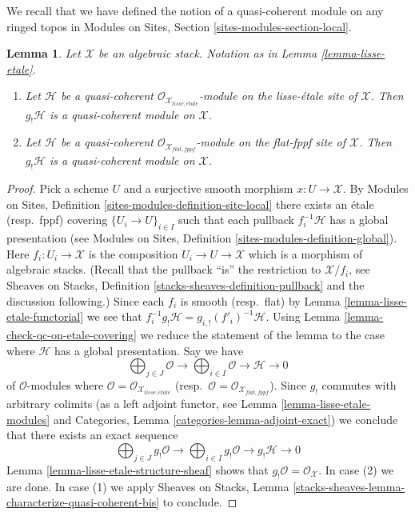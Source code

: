 \documentclass{stacks-project}
\theoremstyle{plain}
\newtheorem{lemma}[subsection]{Lemma}
\theoremstyle{definition}
\theoremstyle{remark}
\numberwithin{equation}{subsection}
\def\etale{{\acute{e}tale}}
\begin{document}
\noindent
We recall that we have defined the notion of a quasi-coherent module on
any ringed topos in
Modules on Sites, Section \ref{sites-modules-section-local}.

\begin{lemma}
\label{lemma-shriek-quasi-coherent}
Let $\mathcal{X}$ be an algebraic stack. Notation as in
Lemma \ref{lemma-lisse-etale}.
\begin{enumerate}
\item Let $\mathcal{H}$ be a quasi-coherent
$\mathcal{O}_{\mathcal{X}_{lisse,\etale}}$-module 
on the lisse-\'etale site of $\mathcal{X}$. Then $g_!\mathcal{H}$ is a
quasi-coherent module on $\mathcal{X}$.
\item Let $\mathcal{H}$ be a quasi-coherent
$\mathcal{O}_{\mathcal{X}_{flat,fppf}}$-module 
on the flat-fppf site of $\mathcal{X}$. Then $g_!\mathcal{H}$ is a
quasi-coherent module on $\mathcal{X}$.
\end{enumerate}
\end{lemma}

\begin{proof}
Pick a scheme $U$ and a surjective smooth morphism $x : U \to \mathcal{X}$.
By
Modules on Sites, Definition \ref{sites-modules-definition-site-local}
there exists an \'etale (resp.\ fppf) covering
$\{U_i \to U\}_{i \in I}$ such that each pullback $f_i^{-1}\mathcal{H}$
has a global presentation (see
Modules on Sites, Definition \ref{sites-modules-definition-global}).
Here $f_i : U_i \to \mathcal{X}$ is the composition
$U_i \to U \to \mathcal{X}$ which is a morphism of algebraic stacks.
(Recall that the pullback ``is'' the restriction to $\mathcal{X}/f_i$, see
Sheaves on Stacks, Definition \ref{stacks-sheaves-definition-pullback}
and the discussion following.) Since each $f_i$ is smooth (resp.\ flat) by
Lemma \ref{lemma-lisse-etale-functorial}
we see that $f_i^{-1}g_!\mathcal{H} = g_{i, !}(f'_i)^{-1}\mathcal{H}$.
Using Lemma \ref{lemma-check-qc-on-etale-covering}
we reduce the statement of the lemma to the case where $\mathcal{H}$
has a global presentation. Say we have
$$
\bigoplus\nolimits_{j \in J} \mathcal{O} \longrightarrow
\bigoplus\nolimits_{i \in I} \mathcal{O} \longrightarrow
\mathcal{H} \longrightarrow 0
$$
of $\mathcal{O}$-modules where
$\mathcal{O} = \mathcal{O}_{\mathcal{X}_{lisse,\etale}}$
(resp.\ $\mathcal{O} = \mathcal{O}_{\mathcal{X}_{flat,fppf}}$).
Since $g_!$ commutes with arbitrary colimits (as a left adjoint functor, see
Lemma \ref{lemma-lisse-etale-modules} and
Categories, Lemma \ref{categories-lemma-adjoint-exact})
we conclude that there exists an exact sequence
$$
\bigoplus\nolimits_{j \in J} g_!\mathcal{O} \longrightarrow
\bigoplus\nolimits_{i \in I} g_!\mathcal{O} \longrightarrow
g_!\mathcal{H} \longrightarrow 0
$$
Lemma \ref{lemma-lisse-etale-structure-sheaf}
shows that $g_!\mathcal{O} = \mathcal{O}_\mathcal{X}$.
In case (2) we are done. In case (1) we apply
Sheaves on Stacks, Lemma
\ref{stacks-sheaves-lemma-characterize-quasi-coherent-bis}
to conclude.
\end{proof}
\end{document}
